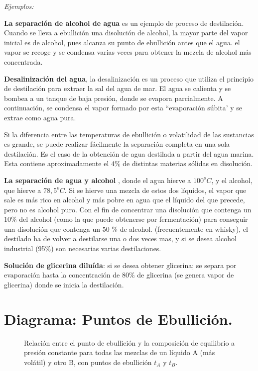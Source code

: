 \documentclass[11pt,openany]{book}
\begin{document}
\textit{Ejemplos:}

\textbf{La separación de alcohol de agua} es un ejemplo de proceso de destilación. Cuando se lleva a ebullición 
una disolución de alcohol, la mayor parte del vapor inicial es de alcohol, pues alcanza su punto de 
ebullición antes que el agua. el vapor se recoge y se condensa varias veces para obtener la mezcla de alcohol
más concentrada.

\textbf{Desalinización del agua}, la desalinización es un proceso que utiliza el principio de destilación para 
extraer la sal del agua de mar. El agua se calienta y se bombea a un tanque de baja presión, donde 
se evapora parcialmente. A continuación, se condensa el vapor formado por esta ``evaporación súbita' y se 
extrae como agua pura.

Si la diferencia entre las temperaturas de ebullición o volatilidad de las sustancias es grande, se 
puede realizar fácilmente la separación completa en una sola destilación. Es el caso de la obtención de
agua destilada a partir del agua marina. Esta contiene aproximadamente el 4\% de distintas materias 
sólidas en disolución.

\textbf{La separación de agua y alcohol} , donde el agua hierve a $100^oC$, y el alcohol, que hierve a $78,5^oC$. Si 
se hierve una mezcla de estos dos líquidos, el vapor que sale es más rico en alcohol y más pobre en 
agua que el líquido del que precede, pero no es alcohol puro. Con el fin de concentrar una 
disolución que contenga un 10\% del alcohol (como la que puede obtenerse por fermentación) para 
conseguir una disolución que contenga un 50 \% de alcohol. (frecuentemente en whisky), el destilado ha 
de volver a destilarse una o dos veces mas, y si se desea alcohol industrial (95\%) son necesarias 
varias destilaciones.

\textbf{Solución de glicerina diluída}: si se desea obtener glicerina; se separa por evaporación hasta la 
concentración de 80\% de glicerina (se genera vapor de glicerina) donde se inicia la destilación.

\section{Diagrama: Puntos de Ebullición.}
\begin{figure}[h]

\caption{Relación entre el punto de ebullición y la composición de equilibrio a presión constante para todas las 
mezclas de un líquido A (más volátil) y otro B, con puntos de ebullición $t_A$ y $t_B$.
}
\end{figure}
\end{document}
